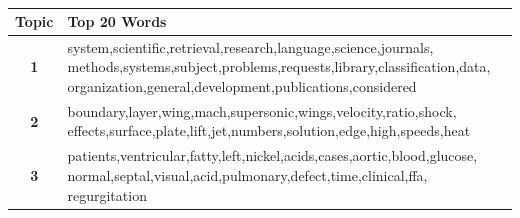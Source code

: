 \documentclass[twoside,12pt]{article}
\begin{document}
\begin{table}[!]
\begin{center}
\begin{tabular}{| c | p{12cm} |}
\hline
\textbf{Topic}& \textbf{Top 20 Words}  \\ \hline
\textbf{1}&system,scientific,retrieval,research,language,science,journals, methods,systems,subject,problems,requests,library,classification,data, organization,general,development,publications,considered\\ \hline
\textbf{2}&boundary,layer,wing,mach,supersonic,wings,velocity,ratio,shock, effects,surface,plate,lift,jet,numbers,solution,edge,high,speeds,heat\\
 \hline
\textbf{3}&patients,ventricular,fatty,left,nickel,acids,cases,aortic,blood,glucose, normal,septal,visual,acid,pulmonary,defect,time,clinical,ffa, regurgitation\\
 \hline
 
\end{tabular}
\caption{}
\label{tableTopWordsClassic}
\end{center}
\end{table}
\end{document}
